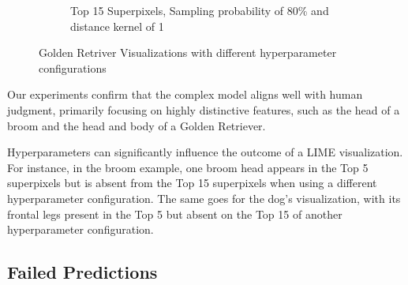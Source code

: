 \begin{figure}
\begin{subfigure}[t]{0.32\textwidth}
        \caption{Top 15 Superpixels, Sampling probability of 80\% and distance kernel of 1}
    \end{subfigure}
    \caption{Golden Retriver Visualizations with different hyperparameter configurations}
\end{figure}

Our experiments confirm that the complex model aligns well with human judgment, primarily focusing on highly distinctive features, such as the head of a broom and the head and body of a Golden Retriever.

Hyperparameters can significantly influence the outcome of a LIME visualization. 
For instance, in the broom example, one broom head appears in the Top 5 superpixels but is absent from the Top 15 superpixels when using a different hyperparameter configuration.
The same goes for the dog's visualization, with its frontal legs present in the Top 5 but absent on the Top 15 of another hyperparameter configuration.

\subsection{Failed Predictions}

